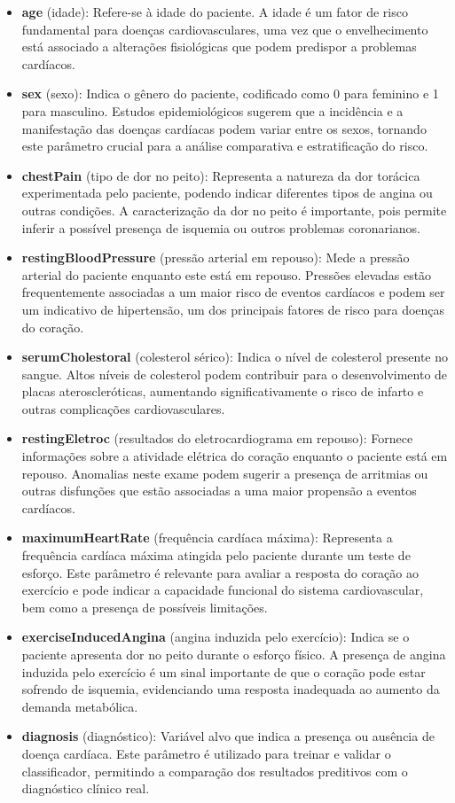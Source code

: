 \documentclass[conference]{IEEEtran}
\begin{document}
\begin{itemize}
    \item \textbf{age} (idade): Refere-se à idade do paciente. A idade é um fator de risco fundamental para doenças cardiovasculares, uma vez que o envelhecimento está associado a alterações fisiológicas que podem predispor a problemas cardíacos.
    \item \textbf{sex} (sexo): Indica o gênero do paciente, codificado como 0 para feminino e 1 para masculino. Estudos epidemiológicos sugerem que a incidência e a manifestação das doenças cardíacas podem variar entre os sexos, tornando este parâmetro crucial para a análise comparativa e estratificação do risco.
    \item \textbf{chestPain} (tipo de dor no peito): Representa a natureza da dor torácica experimentada pelo paciente, podendo indicar diferentes tipos de angina ou outras condições. A caracterização da dor no peito é importante, pois permite inferir a possível presença de isquemia ou outros problemas coronarianos.
    \item \textbf{restingBloodPressure} (pressão arterial em repouso): Mede a pressão arterial do paciente enquanto este está em repouso. Pressões elevadas estão frequentemente associadas a um maior risco de eventos cardíacos e podem ser um indicativo de hipertensão, um dos principais fatores de risco para doenças do coração.
    \item \textbf{serumCholestoral} (colesterol sérico): Indica o nível de colesterol presente no sangue. Altos níveis de colesterol podem contribuir para o desenvolvimento de placas ateroscleróticas, aumentando significativamente o risco de infarto e outras complicações cardiovasculares.
    \item \textbf{restingEletroc} (resultados do eletrocardiograma em repouso): Fornece informações sobre a atividade elétrica do coração enquanto o paciente está em repouso. Anomalias neste exame podem sugerir a presença de arritmias ou outras disfunções que estão associadas a uma maior propensão a eventos cardíacos.
    \item \textbf{maximumHeartRate} (frequência cardíaca máxima): Representa a frequência cardíaca máxima atingida pelo paciente durante um teste de esforço. Este parâmetro é relevante para avaliar a resposta do coração ao exercício e pode indicar a capacidade funcional do sistema cardiovascular, bem como a presença de possíveis limitações.
    \item \textbf{exerciseInducedAngina} (angina induzida pelo exercício): Indica se o paciente apresenta dor no peito durante o esforço físico. A presença de angina induzida pelo exercício é um sinal importante de que o coração pode estar sofrendo de isquemia, evidenciando uma resposta inadequada ao aumento da demanda metabólica.
    \item \textbf{diagnosis} (diagnóstico): Variável alvo que indica a presença ou ausência de doença cardíaca. Este parâmetro é utilizado para treinar e validar o classificador, permitindo a comparação dos resultados preditivos com o diagnóstico clínico real.
\end{itemize}
\end{document}
